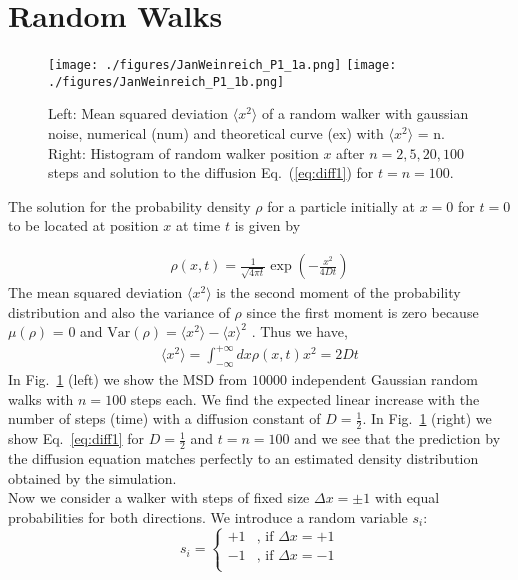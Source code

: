 \documentclass[12pt]{article}
\date{}
\begin{document}
 
 
 
 
 
\section{Random Walks}
\begin{figure}[H]
  \centering
    \texttt{[image: ./figures/JanWeinreich\_P1\_1a.png]}
    \texttt{[image: ./figures/JanWeinreich\_P1\_1b.png]}
    \caption{Left: Mean squared deviation $\langle x^2 \rangle$ of a random walker with gaussian noise, 
             numerical (num) and theoretical curve (ex) with $\langle x^2 \rangle$ = n.  
             Right: Histogram of random walker position $x$ after $n=2, 5, 20, 100$ steps and solution to the diffusion 
             Eq.~(\ref{eq:diff1}) for $t= n=100$.}
    \label{fig:abb1}
  \end{figure}
 
 
The solution for the probability density $\rho$ for a particle
initially at $x=0$ for $t=0$ to be located at position $x$ at time $t$ is given by
 
\begin{align}
    \rho (x, t) = \frac{1}{\sqrt{4 \pi t}} \exp{   \left( -\frac{x^2}{4Dt} \right) }
\end{align}  
The mean squared deviation $  \langle x^2 \rangle $ is the second moment of the 
probability distribution and also the variance of $\rho$
since the first moment is zero because $\mu(\rho)$ = 0 and
$\text{Var}(\rho) =  \langle x^2 \rangle -  \langle x \rangle^2$ .
Thus we have,
\begin{align}
  \langle x^2 \rangle = \int_{-\infty}^{+\infty} dx \rho (x, t) x^2 = 2 Dt
  \label{eq:diff1}
\end{align}
In Fig.~\ref{fig:abb1} (left) we show the MSD from $10000$ independent Gaussian random walks with $n=100$ steps each.
We find the expected linear increase with the number of steps (time) with a diffusion constant of $D=\frac{1}{2}$.
In Fig.~\ref{fig:abb1} (right) we show Eq.~\ref{eq:diff1} for $D=\frac{1}{2}$ and $t= n=100$ and we see
that the prediction by the diffusion equation matches perfectly to an estimated density distribution obtained 
by the simulation.
\\
 
Now we consider a walker with steps of fixed size $\Delta x = \pm 1 $ with equal probabilities for  both directions.
We introduce a random variable $s_i$:
\[   
s_i = 
     \begin{cases}
       +1 & \text{, if }\Delta x = +1\\
       -1 & \text{, if }\Delta x = -1 \\
     \end{cases}
\]
 
\end{document}
